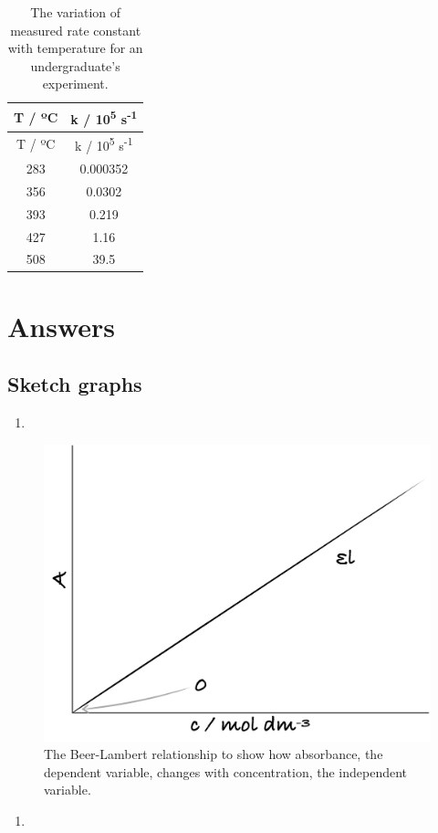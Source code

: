 \documentclass[
]{book}
\providecommand{\tightlist}{%
  \setlength{\itemsep}{0pt}\setlength{\parskip}{0pt}}
\begin{document}
\begin{longtable}[]{@{}cc@{}}
\caption{\label{tab:arrhenius} The variation of measured rate constant with temperature for an undergraduate's experiment.}\tabularnewline
\toprule
T / ºC & k / 10\textsuperscript{5} s\textsuperscript{-1} \\
\midrule
\endfirsthead
\toprule
T / ºC & k / 10\textsuperscript{5} s\textsuperscript{-1} \\
\midrule
\endhead
283 & 0.000352 \\
356 & 0.0302 \\
393 & 0.219 \\
427 & 1.16 \\
508 & 39.5 \\
\bottomrule
\end{longtable}

\hypertarget{sec:Answers3}{%
\section{Answers}\label{sec:Answers3}}

\hypertarget{subsec:sketchans}{%
\subsection{Sketch graphs}\label{subsec:sketchans}}

\begin{enumerate}
\def\labelenumi{\arabic{enumi}.}
\tightlist
\item
\end{enumerate}

\begin{figure}

{\centering \includegraphics[width=0.3\linewidth]{images/abssketch} 

}

\caption{The Beer-Lambert relationship to show how absorbance, the dependent variable, changes with concentration, the independent variable.}\label{fig:abs}
\end{figure}

\begin{enumerate}
\def\labelenumi{\arabic{enumi}.}
\setcounter{enumi}{1}
\tightlist
\item
\end{enumerate}
\end{document}
